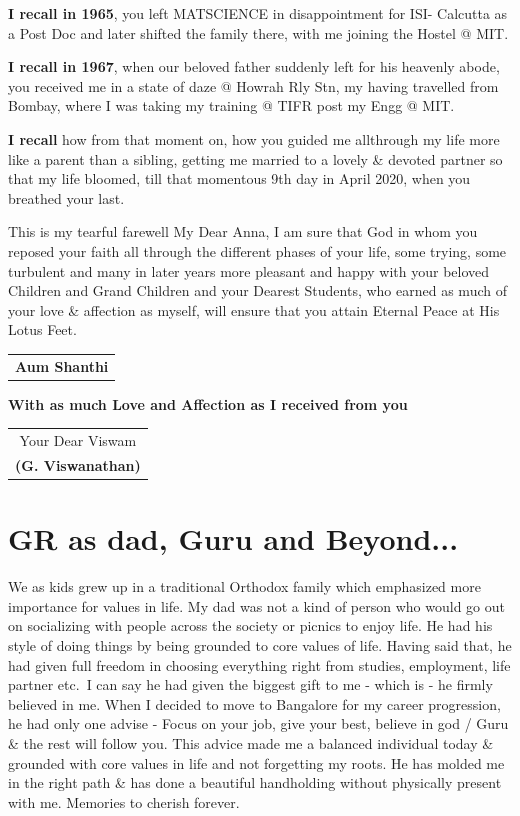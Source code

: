 \textbf{I recall in 1965}, you left MATSCIENCE in disappointment for ISI- Calcutta as a Post Doc and later shifted the family there, with me joining the Hostel @ MIT.

\textbf{I recall in 1967}, when our beloved father suddenly left for his heavenly abode, you received me in a state of daze @ Howrah Rly Stn, my having travelled from Bombay, where I was taking my training @ TIFR post my Engg @ MIT.

\textbf{I recall} how from that moment on, how you guided me all\break through my life more like a parent than a sibling, getting me married to a lovely \& devoted partner so that my life bloomed, till that momentous 9th day in April 2020, when you breathed your last.

This is my tearful farewell My Dear Anna, I am sure that God in whom you reposed your faith all through the different phases of your life, some trying, some turbulent and many in later years more pleasant and happy with your beloved Children and Grand Children and your Dearest Students, who earned as much of your love \& affection as myself, will ensure that you attain Eternal Peace at His Lotus Feet.
\bigskip


\begin{flushright}
\begin{tabular}{c}
\textbf{Aum Shanthi}
\end{tabular}
\end{flushright}
\bigskip

\noindent 
\textbf{With as much Love and Affection as I received from you}
\bigskip

\begin{flushright}
\begin{tabular}{c}
Your Dear Viswam\\
\textbf{(G. Viswanathan)}
\end{tabular}
\end{flushright}
\bigskip

\section*{GR as dad, Guru and Beyond...}

We as kids grew up in a traditional Orthodox family which emphasized more importance for values in life. My dad was not a kind of person who would go out on socializing with people across the society or picnics to enjoy life. He had his style of doing things by being grounded to core values of life. Having said that, he had given full freedom in choosing everything right from studies, employment, life partner etc.\ I can say he had given the biggest gift to me - which is - he firmly believed in me. When I decided to move to Bangalore for my career progression, he had only one advise - Focus on your job, give your best, believe in god / Guru \& the rest will follow you. This advice made me a balanced individual today \& grounded with core values in life and not forgetting my roots. He has molded me in the right path \& has done a beautiful handholding without physically present with me. Memories to cherish forever.
\bigskip

